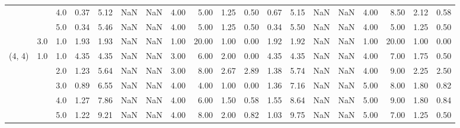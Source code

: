\begin{tabular}{lllrrrrrrrrrrrrrrrr}
       &     & 4.0  &      0.37 &       5.12 &               NaN &                NaN & 4.00 &   5.00 &             1.25 &                         0.50 &      0.67 &       5.15 &               NaN &                NaN & 4.00 &   8.50 &             2.12 &                         0.58 \\
       &     & 5.0  &      0.34 &       5.46 &               NaN &                NaN & 4.00 &   5.00 &             1.25 &                         0.50 &      0.34 &       5.50 &               NaN &                NaN & 4.00 &   5.00 &             1.25 &                         0.50 \\
       & 3.0 & 1.0  &      1.93 &       1.93 &               NaN &                NaN & 1.00 &  20.00 &             1.00 &                         0.00 &      1.92 &       1.92 &               NaN &                NaN & 1.00 &  20.00 &             1.00 &                         0.00 \\
(4, 4) & 1.0 & 1.0  &      4.35 &       4.35 &               NaN &                NaN & 3.00 &   6.00 &             2.00 &                         0.00 &      4.35 &       4.35 &               NaN &                NaN & 4.00 &   7.00 &             1.75 &                         0.50 \\
       &     & 2.0  &      1.23 &       5.64 &               NaN &                NaN & 3.00 &   8.00 &             2.67 &                         2.89 &      1.38 &       5.74 &               NaN &                NaN & 4.00 &   9.00 &             2.25 &                         2.50 \\
       &     & 3.0  &      0.89 &       6.55 &               NaN &                NaN & 4.00 &   4.00 &             1.00 &                         0.00 &      1.36 &       7.16 &               NaN &                NaN & 5.00 &   8.00 &             1.80 &                         0.82 \\
       &     & 4.0  &      1.27 &       7.86 &               NaN &                NaN & 4.00 &   6.00 &             1.50 &                         0.58 &      1.55 &       8.64 &               NaN &                NaN & 5.00 &   9.00 &             1.80 &                         0.84 \\
       &     & 5.0  &      1.22 &       9.21 &               NaN &                NaN & 4.00 &   8.00 &             2.00 &                         0.82 &      1.03 &       9.75 &               NaN &                NaN & 5.00 &   7.00 &             1.25 &                         0.50 \\

\end{tabular}
